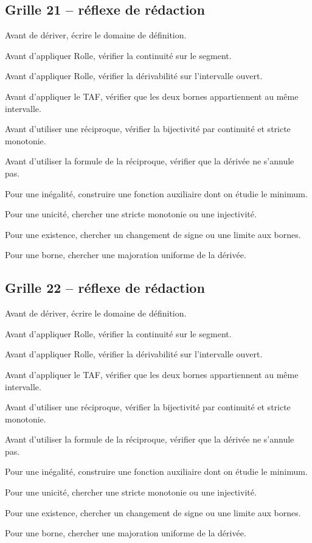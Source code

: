 \documentclass[11pt,a4paper]{article}
\begin{document}
\subsection*{Grille 21 -- réflexe de rédaction}

\begin{methodebox}

Avant de dériver, écrire le domaine de définition.

Avant d'appliquer Rolle, vérifier la continuité sur le segment.

Avant d'appliquer Rolle, vérifier la dérivabilité sur l'intervalle ouvert.

Avant d'appliquer le TAF, vérifier que les deux bornes appartiennent au même intervalle.

Avant d'utiliser une réciproque, vérifier la bijectivité par continuité et stricte monotonie.

Avant d'utiliser la formule de la réciproque, vérifier que la dérivée ne s'annule pas.

Pour une inégalité, construire une fonction auxiliaire dont on étudie le minimum.

Pour une unicité, chercher une stricte monotonie ou une injectivité.

Pour une existence, chercher un changement de signe ou une limite aux bornes.

Pour une borne, chercher une majoration uniforme de la dérivée.

\end{methodebox}

\subsection*{Grille 22 -- réflexe de rédaction}

\begin{methodebox}

Avant de dériver, écrire le domaine de définition.

Avant d'appliquer Rolle, vérifier la continuité sur le segment.

Avant d'appliquer Rolle, vérifier la dérivabilité sur l'intervalle ouvert.

Avant d'appliquer le TAF, vérifier que les deux bornes appartiennent au même intervalle.

Avant d'utiliser une réciproque, vérifier la bijectivité par continuité et stricte monotonie.

Avant d'utiliser la formule de la réciproque, vérifier que la dérivée ne s'annule pas.

Pour une inégalité, construire une fonction auxiliaire dont on étudie le minimum.

Pour une unicité, chercher une stricte monotonie ou une injectivité.

Pour une existence, chercher un changement de signe ou une limite aux bornes.

Pour une borne, chercher une majoration uniforme de la dérivée.

\end{methodebox}
\end{document}
